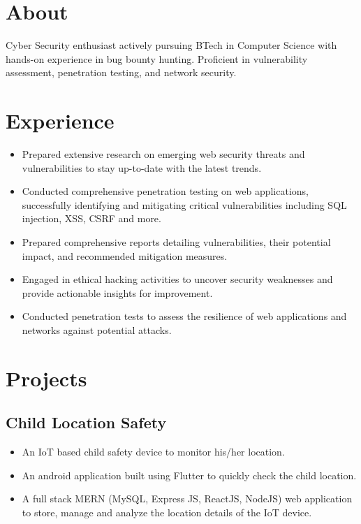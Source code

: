 \documentclass[]{roshan-resume}
\begin{document}
	\begin{minipage}[t]{0.66\textwidth} 
		
		\section{About}
		Cyber Security enthusiast actively pursuing BTech in Computer Science with hands-on experience in bug bounty hunting. Proficient in vulnerability assessment, penetration testing, and network security. 

		
		\section{Experience}
		\begin{itemize}
			\item Prepared extensive research on emerging web security threats and vulnerabilities to stay up-to-date with the latest trends. \\
			\item Conducted comprehensive penetration testing on web applications, successfully identifying and mitigating critical vulnerabilities including SQL injection, XSS, CSRF and more.
			\item Prepared comprehensive reports detailing
			vulnerabilities, their potential impact, and
			recommended mitigation measures. \\
			\item Engaged in ethical hacking activities to uncover
			security weaknesses and provide actionable insights for
			improvement.\\
			\item Conducted penetration tests to assess the resilience of
			web applications and networks against potential
			attacks.
		\end{itemize}
		
		\section{Projects}
		\subsection{Child Location Safety} 
		\begin{itemize}
			\item An IoT based child safety device to monitor his/her location.
			\item An android application built using Flutter to quickly check the child location.
			\item A full stack MERN (MySQL, Express JS, ReactJS, NodeJS) web application to store, manage and analyze the location details of the IoT device.
		\end{itemize}
		

\end{minipage}
\end{document}
